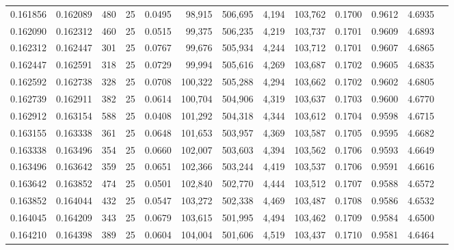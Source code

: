 \begin{tabular}{rrrrrrrrrrrrr}
0.161856 & 0.162089 &   480 &  25 &                                     0.0495 &  98,915 & 506,695 &   4,194 & 103,762 & 0.1700 & 0.9612 & 4.6935 \\
0.162090 & 0.162312 &   460 &  25 &                                     0.0515 &  99,375 & 506,235 &   4,219 & 103,737 & 0.1701 & 0.9609 & 4.6893 \\
0.162312 & 0.162447 &   301 &  25 &                                     0.0767 &  99,676 & 505,934 &   4,244 & 103,712 & 0.1701 & 0.9607 & 4.6865 \\
0.162447 & 0.162591 &   318 &  25 &                                     0.0729 &  99,994 & 505,616 &   4,269 & 103,687 & 0.1702 & 0.9605 & 4.6835 \\
0.162592 & 0.162738 &   328 &  25 &                                     0.0708 & 100,322 & 505,288 &   4,294 & 103,662 & 0.1702 & 0.9602 & 4.6805 \\
0.162739 & 0.162911 &   382 &  25 &                                     0.0614 & 100,704 & 504,906 &   4,319 & 103,637 & 0.1703 & 0.9600 & 4.6770 \\
0.162912 & 0.163154 &   588 &  25 &                                     0.0408 & 101,292 & 504,318 &   4,344 & 103,612 & 0.1704 & 0.9598 & 4.6715 \\
0.163155 & 0.163338 &   361 &  25 &                                     0.0648 & 101,653 & 503,957 &   4,369 & 103,587 & 0.1705 & 0.9595 & 4.6682 \\
0.163338 & 0.163496 &   354 &  25 &                                     0.0660 & 102,007 & 503,603 &   4,394 & 103,562 & 0.1706 & 0.9593 & 4.6649 \\
0.163496 & 0.163642 &   359 &  25 &                                     0.0651 & 102,366 & 503,244 &   4,419 & 103,537 & 0.1706 & 0.9591 & 4.6616 \\
0.163642 & 0.163852 &   474 &  25 &                                     0.0501 & 102,840 & 502,770 &   4,444 & 103,512 & 0.1707 & 0.9588 & 4.6572 \\
0.163852 & 0.164044 &   432 &  25 &                                     0.0547 & 103,272 & 502,338 &   4,469 & 103,487 & 0.1708 & 0.9586 & 4.6532 \\
0.164045 & 0.164209 &   343 &  25 &                                     0.0679 & 103,615 & 501,995 &   4,494 & 103,462 & 0.1709 & 0.9584 & 4.6500 \\
0.164210 & 0.164398 &   389 &  25 &                                     0.0604 & 104,004 & 501,606 &   4,519 & 103,437 & 0.1710 & 0.9581 & 4.6464 \\

\end{tabular}
